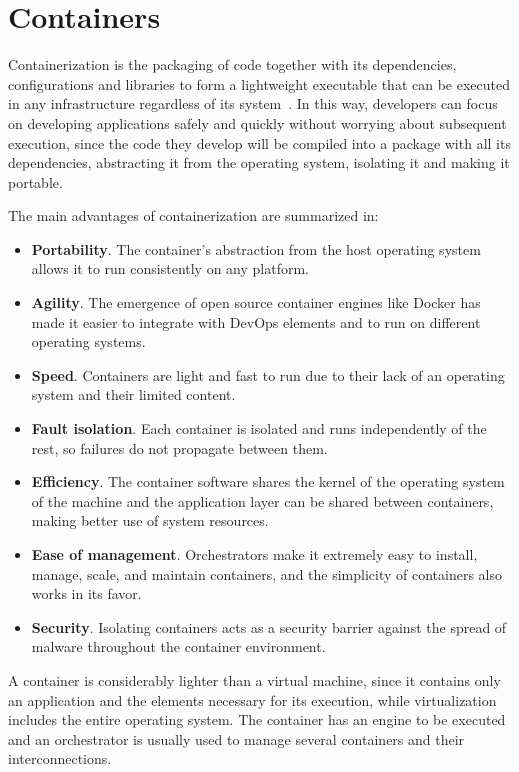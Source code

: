 \section{Containers}

\nonzeroparskip Containerization is the packaging of code together with its dependencies, configurations and libraries to form a lightweight executable that can be executed in any infrastructure regardless of its system~\cite{ibm_containerization}. In this way, developers can focus on developing applications safely and quickly without worrying about subsequent execution, since the code they develop will be compiled into a package with all its dependencies, abstracting it from the operating system, isolating it and making it portable.

\nonzeroparskip The main advantages of containerization are summarized in:
\begin{itemize}
	\item \textbf{Portability}. The container's abstraction from the host operating system allows it to run consistently on any platform.
	\item \textbf{Agility}. The emergence of open source container engines like Docker has made it easier to integrate with DevOps elements and to run on different operating systems.
	\item \textbf{Speed}. Containers are light and fast to run due to their lack of an operating system and their limited content.
	\item \textbf{Fault isolation}. Each container is isolated and runs independently of the rest, so failures do not propagate between them.
	\item \textbf{Efficiency}. The container software shares the kernel of the operating system of the machine and the application layer can be shared between containers, making better use of system resources.
	\item \textbf{Ease of management}. Orchestrators make it extremely easy to install, manage, scale, and maintain containers, and the simplicity of containers also works in its favor.
	\item \textbf{Security}. Isolating containers acts as a security barrier against the spread of malware throughout the container environment.
	\end{itemize}

\nonzeroparskip A container is considerably lighter than a virtual machine, since it contains only an application and the elements necessary for its execution, while virtualization includes the entire operating system. The container has an engine to be executed and an orchestrator is usually used to manage several containers and their interconnections.

